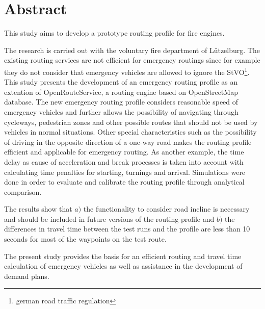 {\centering\section*{Abstract}}

\vspace{1cm}

This study aims to develop a prototype routing profile for fire engines.
\medskip

The research is carried out with the voluntary fire department of Lützelburg.
The existing routing services are not efficient for emergency routings since for example they do not consider that emergency vehicles are allowed to ignore the StVO\footnote{german road traffic regulation}.
This study presents the development of an emergency routing profile as an extention of OpenRouteService, a routing engine based on OpenStreetMap database.
The new emergency routing profile considers reasonable speed of emergency vehicles and further allows the possibility of navigating through cycleways, pedestrian zones and other possible routes that should not be used by vehicles in normal situations.
Other special characteristics such as the possibility of driving in the opposite direction of a one-way road makes the routing profile efficient and applicable for emergency routing.
As another example, the time delay as cause of acceleration and break processes is taken into account with calculating time penalties for starting, turnings and arrival.
Simulations were done in order to evaluate and calibrate the routing profile through analytical comparison.\par
The results show that \newline $a)$ the functionality to consider road incline is necessary and should be included in future versions of the routing profile and \newline $b)$ the differences in travel time between the test runs and the profile are less than 10 seconds for most of the waypoints on the test route.
\bigskip

The present study provides the basis for an efficient routing and travel time calculation of emergency vehicles as well as assistance in the development of demand plans.